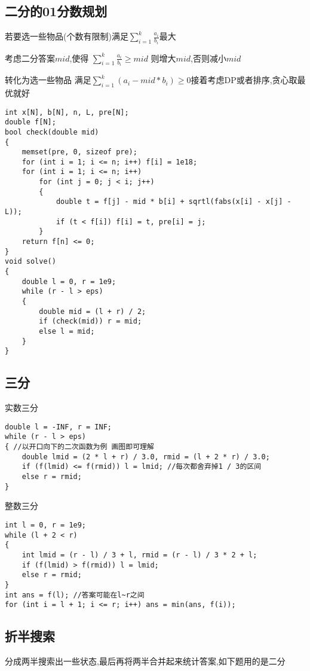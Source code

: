 \documentclass[a4paper, fontset=none]{ctexart}
\begin{document}
\subsection{二分的01分数规划}

若要选一些物品(个数有限制)满足$\sum\limits_{i=1}^k\frac{a_i}{b_i}$最大

考虑二分答案$mid$,使得 $\sum\limits_{i=1}^k\frac{a_i}{b_i}\ge mid$ 则增大$mid$,否则减小$mid$

转化为选一些物品 满足$\sum\limits_{i=1}^k(a_i-mid*b_i)\ge0$接着考虑DP或者排序,贪心取最优就好

\begin{verbatim}
int x[N], b[N], n, L, pre[N];
double f[N];
bool check(double mid)
{
    memset(pre, 0, sizeof pre);
    for (int i = 1; i <= n; i++) f[i] = 1e18;
    for (int i = 1; i <= n; i++)
        for (int j = 0; j < i; j++)
        {
            double t = f[j] - mid * b[i] + sqrtl(fabs(x[i] - x[j] - L));
            if (t < f[i]) f[i] = t, pre[i] = j;
        }
    return f[n] <= 0;
}
void solve()
{
    double l = 0, r = 1e9;
    while (r - l > eps)
    {
        double mid = (l + r) / 2;
        if (check(mid)) r = mid;
        else l = mid;
    }
}
\end{verbatim}
\subsection{三分}

实数三分

\begin{verbatim}
double l = -INF, r = INF;
while (r - l > eps)
{ //以开口向下的二次函数为例 画图即可理解
    double lmid = (2 * l + r) / 3.0, rmid = (l + 2 * r) / 3.0;
    if (f(lmid) <= f(rmid)) l = lmid; //每次都舍弃掉1 / 3的区间
    else r = rmid;
}
\end{verbatim}

整数三分

\begin{verbatim}
int l = 0, r = 1e9;
while (l + 2 < r)
{
    int lmid = (r - l) / 3 + l, rmid = (r - l) / 3 * 2 + l;
    if (f(lmid) > f(rmid)) l = lmid;
    else r = rmid;
}
int ans = f(l); //答案可能在l~r之间
for (int i = l + 1; i <= r; i++) ans = min(ans, f(i));
\end{verbatim}
\subsection{折半搜索}

分成两半搜索出一些状态,最后再将两半合并起来统计答案,如下题用的是二分
\end{document}
